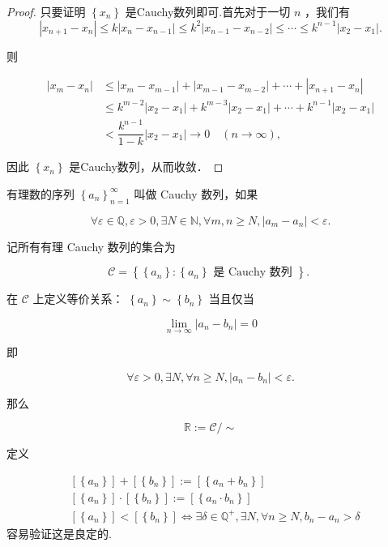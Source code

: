 \begin{proof}
	只要证明 $\left\{x_n\right\}$ 是Cauchy数列即可.首先对于一切 $n$ ，我们有
	$$
	\left|x_{n+1}-x_n\right| \leqslant k\left|x_n-x_{n-1}\right| \leqslant k^2\left|x_{n-1}-x_{n-2}\right| \leqslant \cdots \leqslant k^{n-1}\left|x_2-x_1\right| .
	$$
	
	
	则
	
	$$
	\begin{aligned}
		\left|x_m-x_n\right| & \leqslant\left|x_m-x_{m-1}\right|+\left|x_{m-1}-x_{m-2}\right|+\cdots+\left|x_{n+1}-x_n\right| \\
		& \leqslant k^{m-2}\left|x_2-x_1\right|+k^{m-3}\left|x_2-x_1\right|+\cdots+k^{n-1}\left|x_2-x_1\right| \\
		& <\dfrac{k^{n-1}}{1-k}\left|x_2-x_1\right| \rightarrow 0 \quad(n \rightarrow \infty),
	\end{aligned}
	$$
	
	
	因此 $\left\{x_n\right\}$ 是Cauchy数列，从而收敛．
\end{proof}
\begin{construction}
	有理数的序列 $\left\{a_n\right\}_{n=1}^{\infty}$ 叫做 Cauchy 数列，如果
	
	$$
	\forall \varepsilon \in \mathbb{Q}, \varepsilon>0, \exists N \in \mathbb{N}, \forall m, n \geqslant N,\left|a_m-a_n\right|<\varepsilon .
	$$
	
	
	记所有有理 Cauchy 数列的集合为
	
	$$
	\mathcal{C}=\left\{ \left\{a_n\right\}:\left\{a_n\right\}\text { 是 Cauchy 数列 }\right\} \text {. }
	$$
	
	在 $\mathcal{C}$ 上定义等价关系：
	$\left\{a_n\right\}\sim\left\{b_n\right\}$ 当且仅当
	
	$$
	\lim _{n \rightarrow \infty}\left|a_n-b_n\right|=0
	$$
	
	
	即
	
	$$
	\forall \varepsilon>0, \exists N, \forall n \geqslant N,\left|a_n-b_n\right|<\varepsilon .
	$$
	
	那么
	
	$$
	\mathbb{R}:=\mathcal{C} / \sim
	$$
	
	定义
	
	$$
	\begin{aligned}
		&\left[\left\{a_n\right\}\right]+\left[\left\{b_n\right\}\right]:=\left[\left\{a_n+b_n\right\}\right]\\
		&\left[\left\{a_n\right\}\right] \cdot\left[\left\{b_n\right\}\right]:=\left[\left\{a_n \cdot b_n\right\}\right]\\
		&\left[\left\{a_n\right\}\right]<\left[\left\{b_n\right\}\right] \Longleftrightarrow \exists \delta \in \mathbb{Q}^{+} ,\exists N ,\forall n \geqslant N, b_n-a_n>\delta
	\end{aligned}
	$$
	容易验证这是良定的.
	
	
	
\end{construction}
